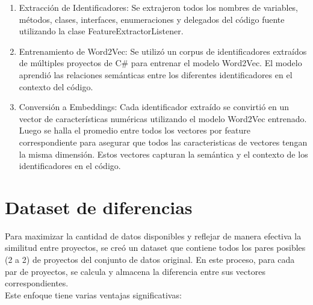 \begin{enumerate}
	\item Extracción de Identificadores: Se extrajeron todos los nombres de variables, métodos, clases, interfaces, enumeraciones y delegados del código fuente utilizando la clase FeatureExtractorListener.
	
	\item Entrenamiento de Word2Vec: Se utilizó un corpus de identificadores extraídos de múltiples proyectos de C\# para entrenar el modelo Word2Vec. El modelo aprendió las relaciones semánticas entre los diferentes identificadores en el contexto del código.
	
	\item Conversión a Embeddings: Cada identificador extraído se convirtió en un vector de características numéricas utilizando el modelo Word2Vec entrenado. Luego se halla el promedio entre todos los vectores por feature correspondiente para asegurar que todos las caracteristicas de vectores tengan la misma dimensión. Estos vectores capturan la semántica y el contexto de los identificadores en el código.
	 
\end{enumerate}

\section{Dataset de diferencias}

Para maximizar la cantidad de datos disponibles y reflejar de manera efectiva la similitud entre proyectos, se creó un dataset que contiene todos los pares posibles (2 a 2) de proyectos del conjunto de datos original. En este proceso, para cada par de proyectos, se calcula y almacena la diferencia entre sus vectores correspondientes.\\

Este enfoque tiene varias ventajas significativas:

